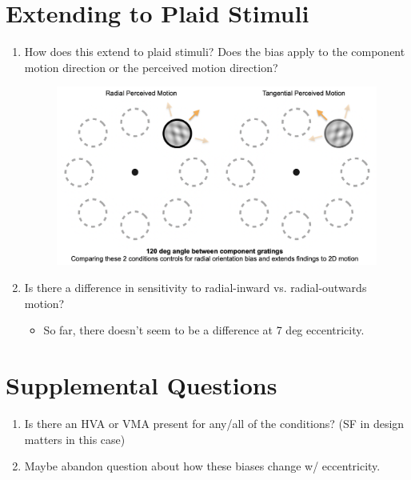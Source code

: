 \documentclass[11pt]{article} %
\begin{document}
\section{Extending to Plaid Stimuli} 
\begin{enumerate}
	\item How does this extend to plaid stimuli? Does the bias apply to the component motion direction or the perceived motion direction?
	\begin{figure}[H]
	\centering %
	\includegraphics[scale=.25]{Images/Cartoon5.png}
	\end{figure}
	\item Is there a difference in sensitivity to radial-inward vs. radial-outwards motion? 
	\begin{itemize}
	\item{So far, there doesn't seem to be a difference at 7 deg eccentricity.}
	\end{itemize}
\end{enumerate}
\section{Supplemental Questions} 
\begin{enumerate}
	\item Is there an HVA or VMA present for any/all of the conditions? (SF in design matters in this case)
	\item Maybe abandon question about how these biases change w/ eccentricity.
\end{enumerate}

\newpage
\end{document}
